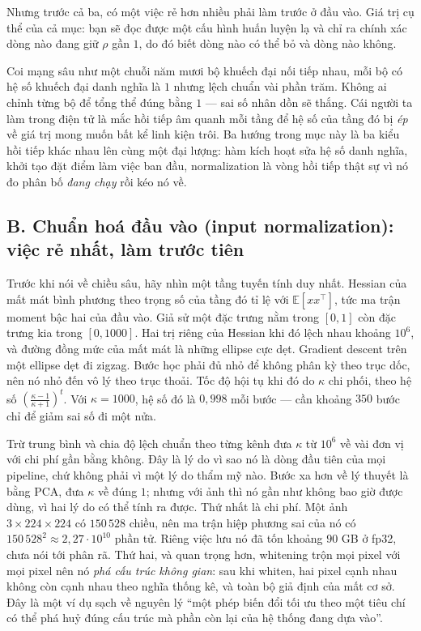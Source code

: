 \documentclass[../../../deep_learning.tex]{subfiles}
\begin{document}
Nhưng trước cả ba, có một việc rẻ hơn nhiều phải làm trước ở đầu vào. Giá trị cụ thể của cả mục: bạn sẽ đọc được một cấu hình huấn luyện lạ và chỉ ra chính xác dòng nào đang giữ \(\rho\) gần \(1\), do đó biết dòng nào có thể bỏ và dòng nào không.

\begin{trucgiac}
Coi mạng sâu như một chuỗi năm mươi bộ khuếch đại nối tiếp nhau, mỗi bộ có hệ số khuếch đại danh nghĩa là \(1\) nhưng lệch chuẩn vài phần trăm. Không ai chỉnh từng bộ để tổng thể đúng bằng \(1\) --- sai số nhân dồn sẽ thắng. Cái người ta làm trong điện tử là mắc hồi tiếp âm quanh mỗi tầng để hệ số của tầng đó bị \emph{ép} về giá trị mong muốn bất kể linh kiện trôi. Ba hướng trong mục này là ba kiểu hồi tiếp khác nhau lên cùng một đại lượng: hàm kích hoạt sửa hệ số danh nghĩa, khởi tạo đặt điểm làm việc ban đầu, normalization là vòng hồi tiếp thật sự vì nó đo phân bố \emph{đang chạy} rồi kéo nó về.
\end{trucgiac}

\subsection{B. Chuẩn hoá đầu vào (input normalization): việc rẻ nhất, làm trước tiên}
Trước khi nói về chiều sâu, hãy nhìn một tầng tuyến tính duy nhất. Hessian của mất mát bình phương theo trọng số của tầng đó tỉ lệ với \(\mathbb{E}[xx^\top]\), tức ma trận moment bậc hai của đầu vào. Giả sử một đặc trưng nằm trong \([0,1]\) còn đặc trưng kia trong \([0,1000]\). Hai trị riêng của Hessian khi đó lệch nhau khoảng \(10^6\), và đường đồng mức của mất mát là những ellipse cực dẹt. Gradient descent trên một ellipse dẹt đi zigzag. Bước học phải đủ nhỏ để không phân kỳ theo trục dốc, nên nó nhỏ đến vô lý theo trục thoải. Tốc độ hội tụ khi đó do  \(\kappa\) chi phối, theo hệ số \(\left(\frac{\kappa-1}{\kappa+1}\right)^t\). Với \(\kappa = 1000\), hệ số đó là \(0{,}998\) mỗi bước --- cần khoảng \(350\) bước chỉ để giảm sai số đi một nửa.

Trừ trung bình và chia độ lệch chuẩn theo từng kênh đưa \(\kappa\) từ \(10^6\) về vài đơn vị với chi phí gần bằng không. Đây là lý do vì sao nó là dòng đầu tiên của mọi pipeline, chứ không phải vì một lý do thẩm mỹ nào. Bước xa hơn về lý thuyết là  bằng PCA, đưa \(\kappa\) về đúng \(1\); nhưng với ảnh thì nó gần như không bao giờ được dùng, vì hai lý do có thể tính ra được. Thứ nhất là chi phí. Một ảnh \(3\times224\times224\) có \(150\,528\) chiều, nên ma trận hiệp phương sai của nó có \(150\,528^2 \approx 2{,}27\cdot 10^{10}\) phần tử. Riêng việc lưu nó đã tốn khoảng \(90\) GB ở fp32, chưa nói tới phân rã. Thứ hai, và quan trọng hơn, whitening trộn mọi pixel với mọi pixel nên nó \emph{phá cấu trúc không gian}: sau khi whiten, hai pixel cạnh nhau không còn cạnh nhau theo nghĩa thống kê, và toàn bộ giả định  của  mất cơ sở. Đây là một ví dụ sạch về nguyên lý ``một phép biến đổi tối ưu theo một tiêu chí có thể phá huỷ đúng cấu trúc mà phần còn lại của hệ thống đang dựa vào''.
\end{document}

